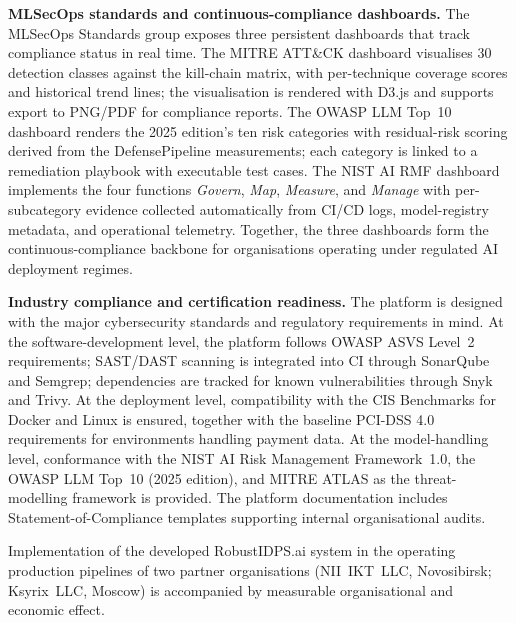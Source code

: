 \noindent\textbf{MLSecOps standards and continuous-compliance dashboards.} The MLSecOps Standards group exposes three persistent dashboards that track compliance status in real time. The MITRE ATT\&CK dashboard visualises 30 detection classes against the kill-chain matrix, with per-technique coverage scores and historical trend lines; the visualisation is rendered with D3.js and supports export to PNG/PDF for compliance reports. The OWASP LLM Top~10 dashboard renders the 2025 edition's ten risk categories with residual-risk scoring derived from the DefensePipeline measurements; each category is linked to a remediation playbook with executable test cases. The NIST AI RMF dashboard implements the four functions \emph{Govern}, \emph{Map}, \emph{Measure}, and \emph{Manage} with per-subcategory evidence collected automatically from CI/CD logs, model-registry metadata, and operational telemetry. Together, the three dashboards form the continuous-compliance backbone for organisations operating under regulated AI deployment regimes.

\noindent\textbf{Industry compliance and certification readiness.} The platform is designed with the major cybersecurity standards and regulatory requirements in mind. At the software-development level, the platform follows OWASP ASVS Level~2 requirements; SAST/DAST scanning is integrated into CI through SonarQube and Semgrep; dependencies are tracked for known vulnerabilities through Snyk and Trivy. At the deployment level, compatibility with the CIS Benchmarks for Docker and Linux is ensured, together with the baseline PCI-DSS 4.0 requirements for environments handling payment data. At the model-handling level, conformance with the NIST AI Risk Management Framework~1.0, the OWASP LLM Top~10 (2025 edition), and MITRE ATLAS as the threat-modelling framework is provided. The platform documentation includes Statement-of-Compliance templates supporting internal organisational audits.

\label{sec:economic_effect}

Implementation of the developed RobustIDPS.ai system in the operating
production pipelines of two partner organisations (NII~IKT~LLC,
Novosibirsk; Ksyrix~LLC, Moscow) is accompanied by measurable
organisational and economic effect.

